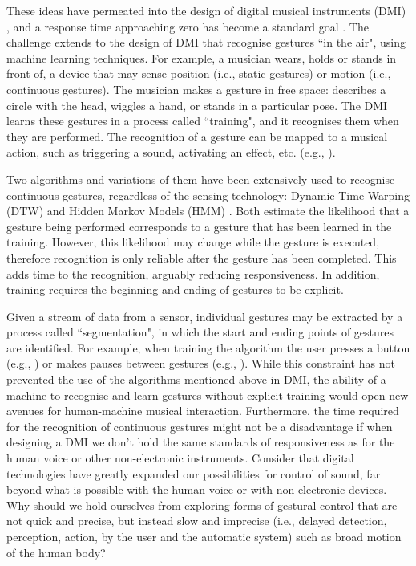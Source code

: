 \documentclass{nime-alternate_ADJ} %
\begin{document}
These ideas have permeated into the design of digital musical instruments (DMI) \cite{Moore_1988}, and a response time approaching zero has become a standard goal \cite{Wessel_Wright_2002, Jack_etal_2018, McPherson_etal_2016}. The challenge extends to the design of DMI that recognise gestures ``in the air", using machine learning techniques. For example, a musician wears, holds or stands in front of, a device that may sense position (i.e., static gestures) or motion (i.e., continuous gestures). The musician makes a gesture in free space: describes a circle with the head, wiggles a hand, or stands in a particular pose. The DMI learns these gestures in a process called ``training", and it recognises them when they are performed. The recognition of a gesture can be mapped to a musical action, such as triggering a sound, activating an effect, etc. (e.g., \cite{Gillian_2011}).

Two algorithms and variations of them have been extensively used to recognise continuous gestures, regardless of the sensing technology: Dynamic Time Warping (DTW) \cite{Gillian_etal_2011} and Hidden Markov Models (HMM) \cite{Bevilacqua_etal_2010}. Both estimate the likelihood that a gesture being performed corresponds to a gesture that has been learned in the training. However, this likelihood may change while the gesture is executed, therefore recognition is only reliable after the gesture has been completed. This adds time to the recognition, arguably reducing responsiveness. In addition, training requires the beginning and ending of gestures to be explicit.

Given a stream of data from a sensor, individual gestures may be extracted by a process called ``segmentation", in which the start and ending points of gestures are identified. For example, when training the algorithm the user presses a button (e.g., \cite{Merril_Paradiso_2005}) or makes pauses between gestures (e.g., \cite{Murad_etal_2017}). While this constraint has not prevented the use of the algorithms mentioned above in DMI, the ability of a machine to recognise and learn gestures without explicit training would open new avenues for human-machine musical interaction. Furthermore, the time required for the recognition of continuous gestures might not be a disadvantage if when designing a DMI we don't hold the same standards of responsiveness as for the human voice or other non-electronic instruments. Consider that digital technologies have greatly expanded our possibilities for control of sound, far beyond what is possible with the human voice or with non-electronic devices. Why should we hold ourselves from exploring forms of gestural control that are not quick and precise, but instead slow and imprecise (i.e., delayed detection, perception, action, by the user and the automatic system) such as broad motion of the human body?
	
\end{document}
